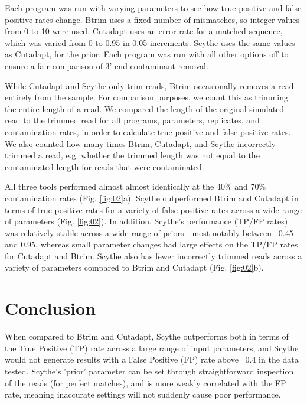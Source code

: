 \documentclass{bioinfo}
\begin{document}
\begin{methods}
Each program was run with varying parameters to see how true positive
and false positive rates change. Btrim uses a fixed number of
mismatches, so integer values from 0 to 10 were used. Cutadapt uses an
error rate for a matched sequence, which was varied from 0 to 0.95 in
0.05 increments. Scythe uses the same values as Cutadapt, for the
prior. Each program was run with all other options off to ensure a
fair comparison of 3'-end contaminant removal.

While Cutadapt and Scythe only trim reads, Btrim occasionally removes
a read entirely from the sample. For comparison purposes, we count
this as trimming the entire length of a read. We compared the length
of the original simulated read to the trimmed read for all programs,
parameters, replicates, and contamination rates, in order to calculate
true positive and false positive rates. We also counted how many times
Btrim, Cutadapt, and Scythe incorrectly trimmed a read, e.g. whether
the trimmed length was not equal to the contaminated length for reads
that were contaminated.

All three tools performed almost almost identically at the 40\% and
70\% contamination rates (Fig. \ref{fig:02}a). Scythe outperformed
Btrim and Cutadapt in terms of true positive rates for a variety of
false positive rates across a wide range of parameters
(Fig. \ref{fig:02}). In addition, Scythe's performance (TP/FP rates)
was relatively stable across a wide range of priors - most notably
between ~0.45 and 0.95, whereas small parameter changes had large
effects on the TP/FP rates for Cutadapt and Btrim. Scythe also has
fewer incorrectly trimmed reads across a variety of parameters
compared to Btrim and Cutadapt (Fig. \ref{fig:02}b).

\end{methods}


\section{Conclusion}

When compared to Btrim and Cutadapt, Scythe outperforms both in terms
of the True Positive (TP) rate across a large range of input
parameters, and Scythe would not generate results with a False
Positive (FP) rate above ~0.4 in the data tested. Scythe's 'prior'
parameter can be set through straightforward inspection of the reads
(for perfect matches), and is more weakly correlated with the FP rate,
meaning inaccurate settings will not suddenly cause poor performance.
\end{document}
